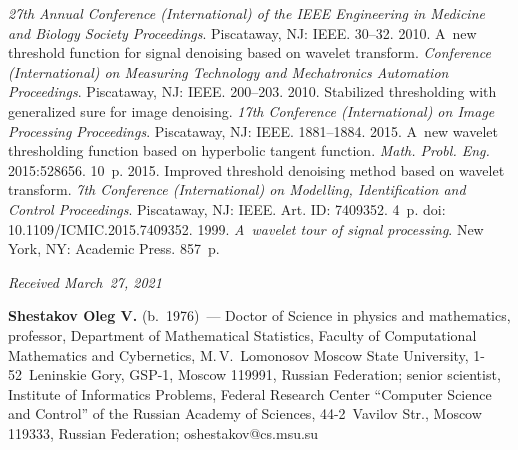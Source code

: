 \begin{multicols}{2}
{{\begin{thebibliography}{99}
 \textit{27th Annual  Conference (International) of the IEEE Engineering in Medicine 
 and Biology Society Proceedings}. Piscataway, NJ: IEEE. 30--32.
 2010. A~new threshold function for signal denoising based on wavelet transform. 
\textit{Conference (International) on Measuring Technology and Mechatronics Automation Proceedings}.
 Piscataway, NJ: IEEE. 200--203.
 2010. Stabilized thresholding with generalized sure for image denoising. 
 \textit{17th Conference (International) on Image Processing Proceedings}. 
 Piscataway, NJ: IEEE. 1881--1884.
 2015. 
A~new wavelet thresholding function based on hyperbolic tangent function. 
\textit{Math. Probl. Eng.} 2015:528656. 10~p.
 2015. Improved threshold denoising method based on wavelet transform.
\textit{7th Conference (International) on Modelling, Identification and Control Proceedings}. 
Piscataway, NJ: 
IEEE. Art. ID: 7409352. 4~p. doi: 10.1109/ICMIC.2015.7409352.
 1999. \textit{A~wavelet tour of signal processing}. New York, NY: Academic Press. 857~p.
 \end{thebibliography}

 }
 }

\end{multicols}

\vspace*{-3pt}

  \hfill{\small\textit{Received March~27, 2021}}




\Contrl

\noindent
\textbf{Shestakov Oleg V.} (b.\ 1976)~--- 
Doctor of Science in physics and mathematics, professor, Department of Mathematical Statistics, 
Faculty of Computational Mathematics and Cybernetics, M.\,V.~Lomonosov Moscow State University, 
1-52~Leninskie Gory, GSP-1, Moscow 119991, Russian Federation; senior scientist, 
Institute of Informatics Problems, Federal Research Center ``Computer Science and Control'' 
of the Russian Academy of Sciences, 44-2~Vavilov Str., Moscow 119333, Russian Federation; 
\mbox{oshestakov@cs.msu.su}
\label{end\stat}

\renewcommand{\bibname}{\protect\rm Литература}